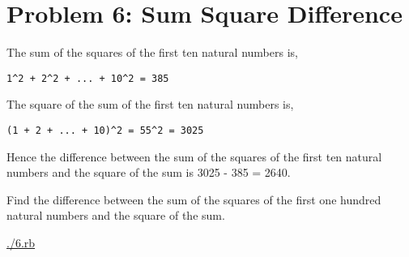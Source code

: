 \documentclass[11pt]{article}
\begin{document}
\section{Problem 6: Sum Square Difference}
\label{sec-6}

The sum of the squares of the first ten natural numbers is,

\begin{verbatim}
1^2 + 2^2 + ... + 10^2 = 385
\end{verbatim}

The square of the sum of the first ten natural numbers is,

\begin{verbatim}
(1 + 2 + ... + 10)^2 = 55^2 = 3025
\end{verbatim}

Hence the difference between the sum of the squares of the first ten natural 
numbers and the square of the sum is 3025 - 385 = 2640.

Find the difference between the sum of the squares of the first one hundred 
natural numbers and the square of the sum.

\url{./6.rb}
\end{document}
